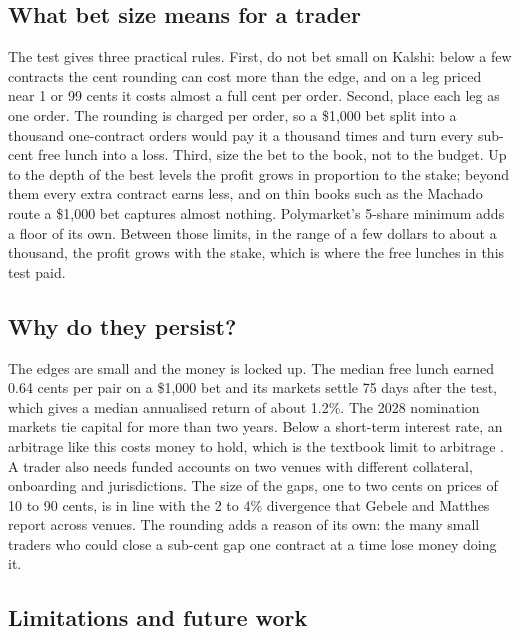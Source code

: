\documentclass[5p,letterpaper]{elsarticle}
\begin{document}
\subsection{What bet size means for a trader}

The test gives three practical rules. First, do not bet small on Kalshi: below a few contracts the cent rounding can cost more than the edge, and on a leg priced near 1 or 99 cents it costs almost a full cent per order. Second, place each leg as one order. The rounding is charged per order, so a \$1,000 bet split into a thousand one-contract orders would pay it a thousand times and turn every sub-cent free lunch into a loss. Third, size the bet to the book, not to the budget. Up to the depth of the best levels the profit grows in proportion to the stake; beyond them every extra contract earns less, and on thin books such as the Machado route a \$1,000 bet captures almost nothing. Polymarket's 5-share minimum adds a floor of its own. Between those limits, in the range of a few dollars to about a thousand, the profit grows with the stake, which is where the free lunches in this test paid.

\subsection{Why do they persist?}

The edges are small and the money is locked up. The median free lunch earned 0.64 cents per pair on a \$1,000 bet and its markets settle 75 days after the test, which gives a median annualised return of about 1.2\%. The 2028 nomination markets tie capital for more than two years. Below a short-term interest rate, an arbitrage like this costs money to hold, which is the textbook limit to arbitrage \cite{shleifer1997,gromb2010}. A trader also needs funded accounts on two venues with different collateral, onboarding and jurisdictions. The size of the gaps, one to two cents on prices of 10 to 90 cents, is in line with the 2 to 4\% divergence that Gebele and Matthes \cite{gebele2026semantic} report across venues. The rounding adds a reason of its own: the many small traders who could close a sub-cent gap one contract at a time lose money doing it.

\subsection{Limitations and future work}\label{sec:limitations}
\end{document}
